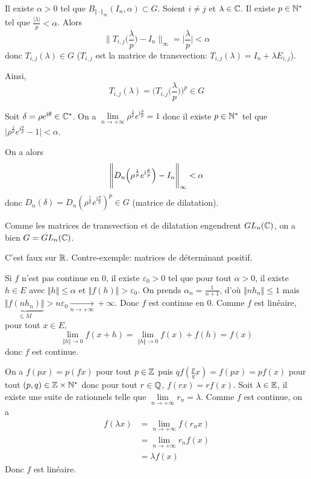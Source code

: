 \begin{solution}
	Il existe $\alpha>0$ tel que $B_{\Vert\cdot\Vert_{\infty}}(I_{n},\alpha)\subset G$. Soient $i\neq j$ et $\lambda\in\mathbb{C}$. Il existe $p\in\mathbb{N}^{*}$ tel que $\frac{\vert\lambda\vert}{p}<\alpha$. Alors 
	$$\Biggl\lVert T_{i,j}\Biggl(\frac{\lambda}{p}\Biggr)-I_{n}\Biggr\rVert_{\infty}=\Biggl\lvert\frac{\lambda}{p}\Biggr\rvert<\alpha$$
	donc $T_{i,j}(\lambda)\in G$ ($T_{i,j}$ est la matrice de transvection: $T_{i,j}(\lambda)=I_{n}+\lambda E_{i,j}$).

	Ainsi,
	$$T_{i,j}(\lambda)=\Biggl(T_{i,j}\Biggl(\frac{\lambda}{p}\Biggr)\Biggr)^{p}\in G$$

	Soit $\delta=\rho e^{\mathrm{i}\theta}\in\mathbb{C}^{*}$. On a $\lim\limits_{n\to+\infty}\rho^{\frac{1}{p}}e^{\mathrm{i}\frac{\theta}{p}}=1$ donc il existe $p\in\mathbb{N}^{*}$ tel que $\vert\rho^{\frac{1}{p}}e^{\mathrm{i}\frac{\theta}{p}}-1\vert<\alpha$.
	
	On a alors
	$$\Biggl\lVert D_{n}\Bigl(\rho^{\frac{1}{p}}e^{\mathrm{i}\frac{\theta}{p}}\Bigr)-I_{n}\Biggr\rVert_{\infty}<\alpha$$
	donc $D_{n}(\delta)=D_{n}(\rho^{\frac{1}{p}}e^{\mathrm{i}\frac{\theta}{p}})^{p}\in G$ (matrice de dilatation).

	Comme les matrices de transvection et de dilatation engendrent $GL_{n}(\mathbb{C})$, on a bien $G=GL_{n}(\mathbb{C})$.
\end{solution}

\begin{remark}
	C'est faux sur $\mathbb{R}$. Contre-exemple: matrices de déterminant positif.
\end{remark}

\begin{solution}
	Si $f$ n'est pas continue en 0, il existe $\varepsilon_{0}>0$ tel que pour tout $\alpha>0$, il existe $h\in E$ avec $\Vert h\Vert\leqslant\alpha$ et $\Vert f(h)\Vert>\varepsilon_{0}$. On prends $\alpha_{n}=\frac{1}{n+1}$, d'où $\Vert nh_{n}\Vert\leqslant1$ mais $\underbrace{\Vert f(nh_{n})\Vert}_{\leqslant M}>n\varepsilon_{0}\xrightarrow[n\to+\infty]{}+\infty$. Donc $f$ est continue en $0$. Comme $f$ est linéaire, pour tout $x\in E$,
	$$\lim\limits_{\Vert h\Vert\to0}f(x+h)=\lim\limits_{\Vert h\Vert\to0}f(x)+f(h)=f(x)$$
	donc $f$ est continue.

	On a $f(px)=p(fx)$ pour tout $p\in\mathbb{Z}$ puis $qf(\frac{p}{q}x)=f(px)=pf(x)$ pour tout $(p,q)\in\mathbb{Z}\times\mathbb{N}^{*}$ donc pour tout $r\in\mathbb{Q}$, $f(rx)=rf(x)$.
	Soit $\lambda\in\mathbb{E}$, il existe une suite de rationnels telle que $\lim\limits_{n\to+\infty} r_{n}=\lambda$. Comme $f$ est continue, on a 
	\begin{align*}
		f(\lambda x)
		&=\lim\limits_{n\to+\infty}f(r_{n}x)\\
		&=\lim\limits_{n\to+\infty}r_{n}f(x)\\
		&=\lambda f(x)
	\end{align*}
	Donc $f$ est linéaire.
\end{solution}

